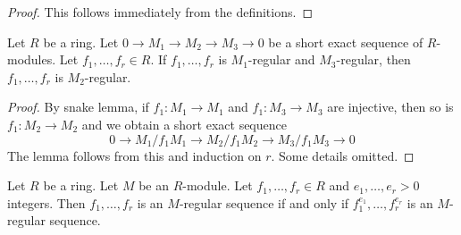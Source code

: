 \begin{proof}
	This follows immediately from the definitions.
\end{proof}

\begin{lemma}\cite[\href{https://stacks.math.columbia.edu/tag/0F1T}{Lemma 0F1T}]{stacks-project}
	\label{lemma-regular-sequence-short-exact-sequence}
	Let $R$ be a ring. Let $0 \to M_1 \to M_2 \to M_3 \to 0$
	be a short exact sequence of $R$-modules. Let $f_1, \ldots, f_r \in R$.
	If $f_1, \ldots, f_r$ is $M_1$-regular and $M_3$-regular, then
	$f_1, \ldots, f_r$ is $M_2$-regular.
\end{lemma}

\begin{proof}
	By snake lemma, if $f_1 : M_1 \to M_1$ and
	$f_1 : M_3 \to M_3$ are injective, then so is $f_1 : M_2 \to M_2$
	and we obtain a short exact sequence
	$$
	0 \to M_1/f_1M_1 \to M_2/f_1M_2 \to M_3/f_1M_3 \to 0
	$$
	The lemma follows from this and induction on $r$. Some details omitted.
\end{proof}

\begin{lemma}\cite[\href{https://stacks.math.columbia.edu/tag/07DV}{Lemma 07DV}]{stacks-project}
	\label{lemma-regular-sequence-powers}
	Let $R$ be a ring. Let $M$ be an $R$-module.
	Let $f_1, \ldots, f_r \in R$ and $e_1, \ldots, e_r > 0$ integers.
	Then $f_1, \ldots, f_r$ is an $M$-regular sequence
	if and only if $f_1^{e_1}, \ldots, f_r^{e_r}$
	is an $M$-regular sequence.
\end{lemma}

